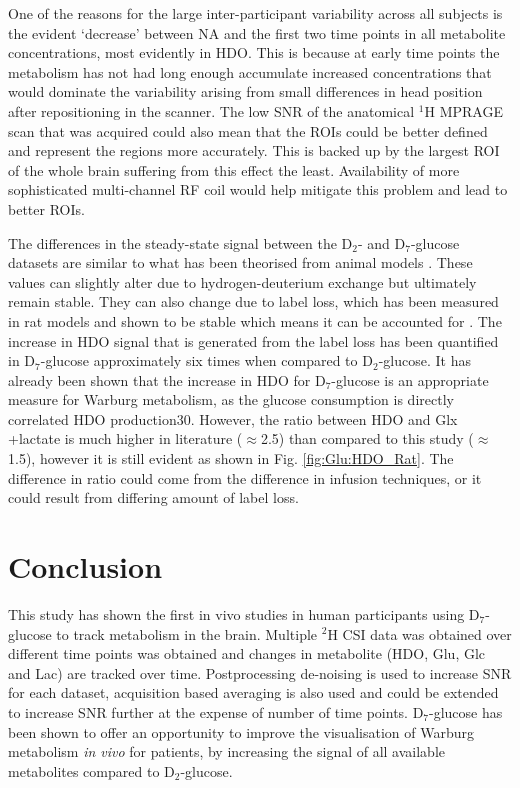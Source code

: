 One of the reasons for the large inter-participant variability across all subjects is the evident ‘decrease’ between \ac{NA} and the first two time points in all metabolite concentrations, most evidently in HDO. This is because at early time points the metabolism has not had long enough accumulate increased concentrations that would dominate the variability arising from small differences in head position after repositioning in the scanner. The low \ac{SNR} of the anatomical $^1$H \ac{MPRAGE} scan that was acquired could also mean that the \ac{ROI}s could be better defined and represent the regions more accurately. This is backed up by the largest ROI of the whole brain suffering from this effect the least. Availability of more sophisticated multi-channel RF coil would help mitigate this problem and lead to better \ac{ROI}s.

The differences in the steady-state signal between the D$_2$- and D$_7$-glucose datasets are similar to what has been theorised from animal models \cite{Mahar2021DeuteratedGlucose}. These values can slightly alter due to hydrogen-deuterium exchange but ultimately remain stable. They can also change due to label loss, which has been measured in rat models and shown to be stable which means it can be accounted for \cite{DeGraaf2021CharacterizationStudies}. The increase in \ac{HDO} signal that is generated from the label loss has been quantified in D$_7$-glucose approximately six times when compared to D$_2$-glucose. It has already been shown that the increase in \ac{HDO} for D$_7$-glucose is an appropriate measure for Warburg metabolism, as the glucose consumption is directly correlated HDO production30. However, the ratio between \ac{HDO} and Glx +lactate is much higher in literature ($\approx$2.5) than compared to this study ($\approx$1.5), however it is still evident as shown in Fig. \ref{fig:Glu:HDO_Rat}. The difference in ratio could come from the difference in infusion techniques, or it could result from differing amount of label loss.

\section{Conclusion}

This study has shown the first in vivo studies in human participants using D$_7$-glucose to track metabolism in the brain. Multiple $^2$H \ac{CSI} data was obtained over different time points was obtained and changes in metabolite (\ac{HDO}, Glu, Glc and Lac) are tracked over time. Postprocessing de-noising is used to increase \ac{SNR} for each dataset, acquisition based averaging is also used and could be extended to increase \ac{SNR} further at the expense of number of time points. D$_7$-glucose has been shown to offer an opportunity to improve the visualisation of Warburg metabolism \textit{in vivo} for patients, by increasing the signal of all available metabolites compared to D$_2$-glucose. 